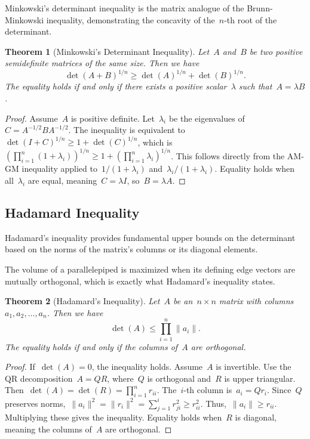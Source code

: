 \documentclass[12pt]{article}
\newtheorem{theorem}{Theorem}[section]
\begin{document}
\noindent Minkowski's determinant inequality is the matrix analogue of the Brunn-Minkowski inequality, demonstrating the concavity of the~$n$-th root of the determinant.
\begin{theorem}[Minkowski's Determinant Inequality]
Let~$A$ and~$B$ be two positive semidefinite matrices of the same size. Then we have
\[ \det(A + B)^{1/n} \ge \det(A)^{1/n} + \det(B)^{1/n}. \]
The equality holds if and only if there exists a positive scalar~$\lambda$ such that~$A = \lambda B$.
\end{theorem}
\begin{proof}
Assume~$A$ is positive definite. Let~$\lambda_i$ be the eigenvalues of~$C = A^{-1/2}BA^{-1/2}$. The inequality is equivalent to~$\det(I+C)^{1/n} \ge 1 + \det(C)^{1/n}$, which is~$(\prod_{i=1}^n (1+\lambda_i))^{1/n} \ge 1 + (\prod_{i=1}^n \lambda_i)^{1/n}$. This follows directly from the AM-GM inequality applied to~$1/(1+\lambda_i)$ and~$\lambda_i/(1+\lambda_i)$. Equality holds when all~$\lambda_i$ are equal, meaning~$C = \lambda I$, so~$B = \lambda A$.
\end{proof}

\subsection{Hadamard Inequality}
Hadamard's inequality provides fundamental upper bounds on the determinant based on the norms of the matrix's columns or its diagonal elements.

\noindent The volume of a parallelepiped is maximized when its defining edge vectors are mutually orthogonal, which is exactly what Hadamard's inequality states.
\begin{theorem}[Hadamard's Inequality]
Let~$A$ be an~$n \times n$ matrix with columns~$a_1, a_2, \dots, a_n$. Then we have
\[ \det(A) \le \prod_{i=1}^n \|a_i\|. \]
The equality holds if and only if the columns of~$A$ are orthogonal.
\end{theorem}
\begin{proof}
If~$\det(A) = 0$, the inequality holds. Assume~$A$ is invertible. Use the QR decomposition~$A = QR$, where~$Q$ is orthogonal and~$R$ is upper triangular. Then~$\det(A) = \det(R) = \prod_{i=1}^n r_{ii}$. The~$i$-th column is~$a_i = Q r_i$. Since~$Q$ preserves norms,~$\|a_i\|^2 = \|r_i\|^2 = \sum_{j=1}^i r_{ji}^2 \ge r_{ii}^2$. Thus,~$\|a_i\| \ge r_{ii}$. Multiplying these gives the inequality. Equality holds when~$R$ is diagonal, meaning the columns of~$A$ are orthogonal.
\end{proof}
\end{document}
